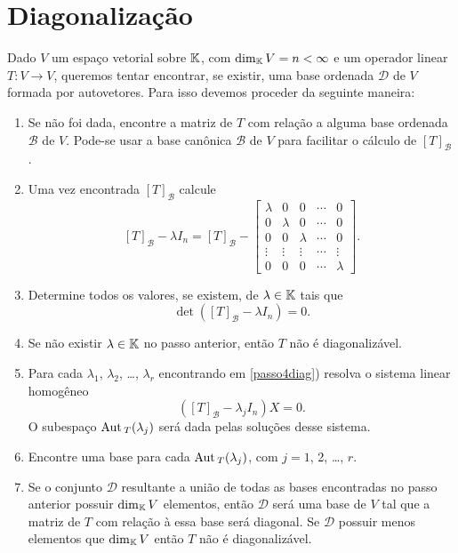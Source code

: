 \section{Diagonalização}
Dado $V$ um espaço vetorial sobre $\mathbb{K}$, com $\dim_{\mathbb{K}} V = n < \infty$ e um operador linear $T \colon V \to V$, queremos tentar
encontrar, se existir, uma base ordenada $\mathcal{D}$ de $V$ formada por autovetores. Para isso devemos proceder da seguinte maneira:
\begin{enumerate}
    \item Se não foi dada, encontre a matriz de $T$ com relação a alguma base ordenada $\mathcal{B}$ de $V$. Pode-se usar a base canônica
        $\mathcal{B}$ de $V$ para facilitar o cálculo de $[T]_\mathcal{B}$.

    \item Uma vez encontrada $[T]_\mathcal{B}$ calcule
        \[
            [T]_\mathcal{B} - \lambda I_n = [T]_\mathcal{B} - \begin{bmatrix}\lambda & 0 & 0 & \cdots & 0\\0 & \lambda & 0 & \cdots &
            0\\0 & 0 & \lambda & \cdots & 0\\\vdots & \vdots & \vdots & \cdots & \vdots\\0 & 0 & 0 & \cdots & \lambda\end{bmatrix}.
        \]

    \item\label{passo4diag} Determine todos os valores, se existem, de $\lambda \in \mathbb{K}$ tais que
        \[
            \det([T]_\mathcal{B} - \lambda I_n) = 0.
        \]

    \item Se não existir $\lambda \in \mathbb{K}$ no passo anterior, então $T$ não é diagonalizável.

    \item Para cada $\lambda_1$, $\lambda_2$, \dots, $\lambda_r$ encontrando em \ref{passo4diag}) resolva o sistema linear homogêneo
        \[
            ([T]_\mathcal{B} - \lambda_jI_n)X = 0.
        \]
        O subespaço ${\rm Aut\,}_T(\lambda_j)$ será dada pelas soluções desse sistema.

    \item Encontre uma base para cada ${\rm Aut\,}_T(\lambda_j)$, com $j = 1$, 2, \dots, $r$.

    \item Se o conjunto $\mathcal{D}$ resultante a união de todas as bases encontradas no passo anterior possuir $\dim_{\mathbb{K}}V$ elementos,
        então $\mathcal{D}$ será uma base de $V$ tal que a matriz de $T$ com relação à essa base será diagonal. Se $\mathcal{D}$ possuir
        menos elementos que $\dim_{\mathbb{K}}V$ então $T$ não é diagonalizável.
\end{enumerate}

